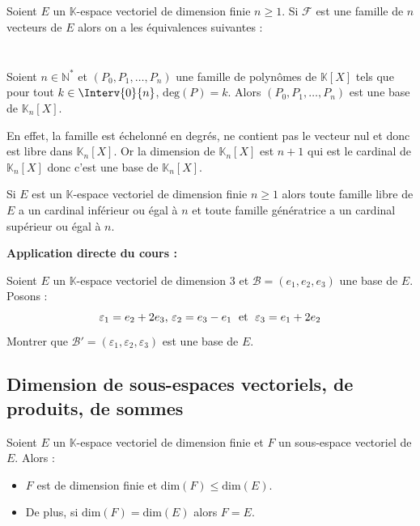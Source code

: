 \documentclass[french,11pt,twoside]{VcCours}
\newenvironment{ApplicationDirecte}{\textbf{Application directe du cours :}

}{}
\begin{document}
 \begin{Proposition}{}
 Soient $E$ un $\mathbb{K}$-espace vectoriel de dimension finie $n \geq 1$. Si $\mathcal{F}$ est une famille de $n$ vecteurs de $E$ alors on a les équivalences suivantes : 
$$ \phantom{\mathcal{F} \hbox{ est une base de E} \Longleftrightarrow \mathcal{F} \hbox{ est libre } \Longleftrightarrow \mathcal{F} \hbox{ est génératrice de E }}$$
\end{Proposition}

\begin{Exemple} Soient $n \in \mathbb{N}^*$ et $(P_0,P_1, \ldots, P_n)$ une famille de polynômes de $\mathbb{K}[X]$ tels que pour tout $k \in \Interv{0}{n}$, $\textrm{deg}(P) = k$. Alors $(P_0,P_1, \ldots, P_n)$ est une base de $\mathbb{K}_n[X]$.

En effet, la famille est échelonné en degrés, ne contient pas le vecteur nul et donc est libre dans $\mathbb{K}_n[X]$. Or la dimension de $\mathbb{K}_n[X]$ est $n+1$ qui est le cardinal de $\mathbb{K}_n[X]$ donc c'est une base de $\mathbb{K}_n[X]$.
\end{Exemple}

\medskip

\begin{Remarque}{} Si $E$ est un $\mathbb{K}$-espace vectoriel de dimension finie $n \geq 1$ alors toute famille libre de $E$ a un cardinal inférieur ou égal à $n$ et toute famille génératrice a un cardinal supérieur ou égal à $n$.
\end{Remarque}

\begin{ApplicationDirecte} Soient $E$ un $\mathbb{K}$-espace vectoriel de dimension 3 et $\mathcal{B} = (e_{1} ,e_{2} ,e_{3})$ une base de $E$. Posons :
  \[
  \varepsilon_{1} = e_{2} + 2e_{3} , \, \varepsilon_{2} = e_{3} - e_{1} \; \hbox{ et } \; \varepsilon_{3} = e_{1} + 2e_{2}
  \]
Montrer que $\mathcal{B}' = (\varepsilon_{1} ,\varepsilon_{2} ,\varepsilon_{3})$ est une base de $E$.
\end{ApplicationDirecte}

\subsection{Dimension de sous-espaces vectoriels, de produits, de sommes}

\begin{Proposition}{}  Soient $E$ un $\mathbb{K}$-espace vectoriel de dimension finie et $F$ un sous-espace vectoriel de $E$. Alors :

\begin{itemize}
\item $F$ est de dimension finie et $\textrm{dim}(F) \leq \textrm{dim}(E)$.
\item De plus, si $\textrm{dim}(F) = \textrm{dim}(E)$ alors $F=E$.
\end{itemize}
\end{Proposition}
\end{document}
